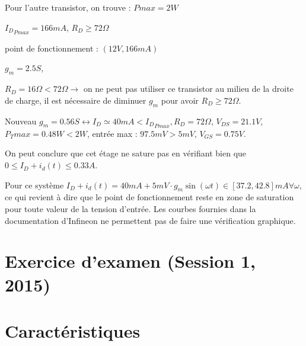 \documentclass{../template/tp}
\begin{document}
{Pour l'autre transistor, on trouve :
$Pmax=2W$

${I_D}_{Pmax}=166mA$, $R_D\geq 72\Omega$

point de fonctionnement : $(12V, 166mA)$

$g_m=2.5S$,

$R_D=16\Omega<72\Omega \longrightarrow$ on ne peut pas utiliser ce transistor au milieu de la droite de charge, il est nécessaire de diminuer $g_m$ pour avoir $R_D\geq 72\Omega$.

Nouveau $g_m=0.56S \longleftrightarrow I_D\simeq 40mA<{I_D}_{Pmax}, R_D=72\Omega$, $V_{DS}=21.1V$, $P_Tmax=0.48W<2W$, entrée max : $97.5mV>5mV$, $V_{GS}=0.75V$.

On peut conclure que cet étage ne sature pas en vérifiant bien que $0\leq I_D+i_d(t)\leq 0.33A$. 

Pour ce système $I_D+i_d(t)=40mA+5mV\cdot g_m \sin(\omega t)\in \left[37.2,42.8\right]mA\forall \omega$, ce qui revient à dire que le point de fonctionnement reste en zone de saturation pour toute valeur de la tension d'entrée. Les courbes fournies dans la documentation d'Infineon ne permettent pas de faire une vérification graphique.


}

\newpage
\section{Exercice d'examen (Session 1, 2015)}

\appendix
\vspace*{-3cm}
\section{Caractéristiques}
\end{document}
